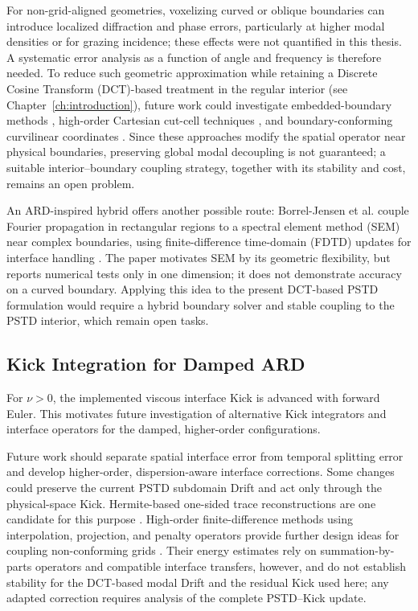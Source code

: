 \documentclass{Configuration_Files/PoliMi3i_thesis}
\newif\ifshowthesischanges
\DeclareRobustCommand{\thesischange}[2]{%
    \ifshowthesischanges
        \textcolor{#1}{#2}%
    \else
        #2%
    \fi
}
\def\thesischange#1#2{#2}%
\begin{document}
\thesischange{red}{For non-grid-aligned geometries, voxelizing curved or oblique boundaries can introduce localized diffraction and phase errors, particularly at higher modal densities or for grazing incidence; these effects were not quantified in this thesis. A systematic error analysis as a function of angle and frequency is therefore needed. To reduce such geometric approximation while retaining a Discrete Cosine Transform (DCT)-based treatment in the regular interior (see Chapter~\ref{ch:introduction}), future work could investigate embedded-boundary methods \citep{alsalem_embedded_2018,appelo_fourth_2012}, high-order Cartesian cut-cell techniques \citep{popescu_finite_2008}, and boundary-conforming curvilinear coordinates \citep{cerimele_numerical_2008,yuan_perfectly_2014}. Since these approaches modify the spatial operator near physical boundaries, preserving global modal decoupling is not guaranteed; a suitable interior--boundary coupling strategy, together with its stability and cost, remains an open problem.}

\thesischange{red}{An ARD-inspired hybrid offers another possible route: Borrel-Jensen et al. couple Fourier propagation in rectangular regions to a spectral element method (SEM) near complex boundaries, using finite-difference time-domain (FDTD) updates for interface handling \citep{borrel_jensen_fourier_sem_2022}. The paper motivates SEM by its geometric flexibility, but reports numerical tests only in one dimension; it does not demonstrate accuracy on a curved boundary. Applying this idea to the present DCT-based PSTD formulation would require a hybrid boundary solver and stable coupling to the PSTD interior, which remain open tasks.}

\subsection{\thesischange{red}{Kick Integration for Damped ARD}}

\thesischange{red}{For $\nu>0$, the implemented viscous interface Kick is advanced with forward Euler. This motivates future investigation of alternative Kick integrators and interface operators for the damped, higher-order configurations.}

\thesischange{red}{Future work should separate spatial interface error from temporal splitting error and develop higher-order, dispersion-aware interface corrections. Some changes could preserve the current PSTD subdomain Drift and act only through the physical-space Kick. Hermite-based one-sided trace reconstructions are one candidate for this purpose \citep{appelo_hermite_2018}. High-order finite-difference methods using interpolation, projection, and penalty operators provide further design ideas for coupling non-conforming grids \citep{wang_virta_kreiss_2016,wang_improved_2018,eriksson_nonconforming_2023}. Their energy estimates rely on summation-by-parts operators and compatible interface transfers, however, and do not establish stability for the DCT-based modal Drift and the residual Kick used here; any adapted correction requires analysis of the complete PSTD--Kick update.}
\end{document}

